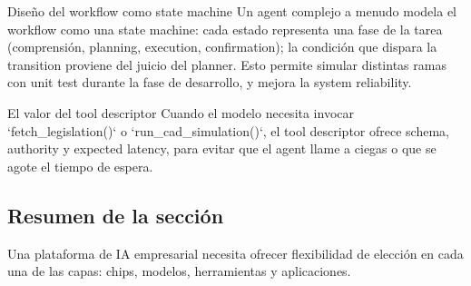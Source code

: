 \begin{knowledgebox}{Diseño del workflow como state machine}
Un agent complejo a menudo modela el workflow como una state machine: cada estado representa una fase de la tarea (comprensión, planning, execution, confirmation); la condición que dispara la transition proviene del juicio del planner. Esto permite simular distintas ramas con unit test durante la fase de desarrollo, y mejora la system reliability.
\end{knowledgebox}
\begin{knowledgebox}{El valor del tool descriptor}
Cuando el modelo necesita invocar `fetch\_legislation()` o `run\_cad\_simulation()`, el tool descriptor ofrece schema, authority y expected latency, para evitar que el agent llame a ciegas o que se agote el tiempo de espera.
\end{knowledgebox}

\subsection{Resumen de la sección}

Una plataforma de IA empresarial necesita ofrecer flexibilidad de elección en cada una de las capas: chips, modelos, herramientas y aplicaciones.

